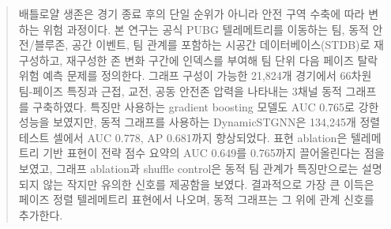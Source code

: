 \begin{abstract}
배틀로얄 생존은 경기 종료 후의 단일 순위가 아니라 안전 구역 수축에
따라 변하는 위험 과정이다. 본 연구는 공식 PUBG 텔레메트리를 이동하는
팀, 동적 안전/블루존, 공간 이벤트, 팀 관계를 포함하는 시공간
데이터베이스(STDB)로 재구성하고, 재구성한 존 변화 구간에 인덱스를
부여해 팀 단위 다음 페이즈 탈락 위험 예측 문제를 정의한다. 그래프 구성이 가능한
21,824개 경기에서 66차원 팀-페이즈 특징과 근접, 교전, 공동 안전존
압력을 나타내는 3채널 동적 그래프를 구축하였다. 특징만 사용하는
gradient boosting 모델도 AUC 0.765로 강한 성능을 보였지만, 동적
그래프를 사용하는 DynamicSTGNN은 134,245개 정렬 테스트 셀에서
AUC 0.778, AP 0.681까지 향상되었다. 표현 ablation은 텔레메트리
기반 표현이 전략 점수 요약의 AUC 0.649를 0.765까지 끌어올린다는 점을
보였고, 그래프 ablation과 shuffle control은 동적 팀
관계가 특징만으로는 설명되지 않는 작지만 유의한 신호를 제공함을
보였다. 결과적으로 가장 큰 이득은 페이즈 정렬 텔레메트리 표현에서
나오며, 동적 그래프는 그 위에 관계 신호를 추가한다.
\end{abstract}
